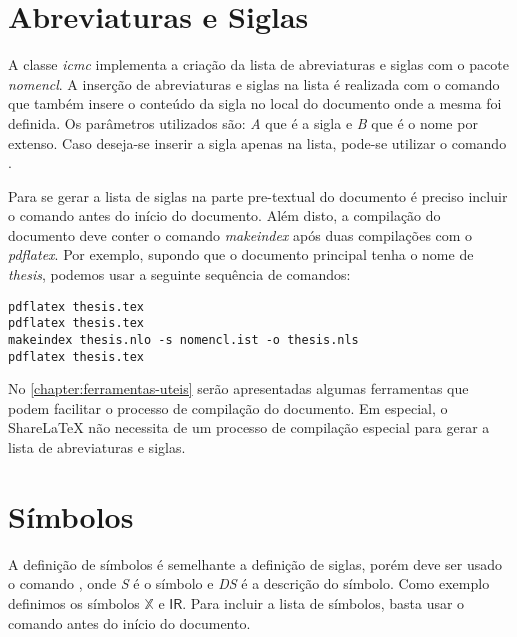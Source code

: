 \section{Abreviaturas e Siglas}

A classe \textit{icmc} implementa a criação da lista de abreviaturas e siglas com o pacote \textit{nomencl}. A inserção de abreviaturas e siglas na lista é realizada com o comando  que também insere o conteúdo da sigla no local do documento onde a mesma foi definida. Os parâmetros utilizados são: \textit{A} que é a sigla e \textit{B} que é o nome por extenso. Caso deseja-se inserir a sigla apenas na lista, pode-se utilizar o comando .

Para se gerar a lista de siglas na parte pre-textual do documento é preciso incluir o comando  antes do início do documento. Além disto, a compilação do documento deve conter o comando \textit{makeindex} após duas compilações com o \textit{pdflatex}. Por exemplo, supondo que o documento principal tenha o nome de \textit{thesis}, podemos usar a seguinte sequência de comandos:

\begin{verbatim}
pdflatex thesis.tex
pdflatex thesis.tex
makeindex thesis.nlo -s nomencl.ist -o thesis.nls
pdflatex thesis.tex
\end{verbatim}

No \autoref{chapter:ferramentas-uteis} serão apresentadas algumas ferramentas que podem facilitar o processo de compilação do documento. Em especial, o ShareLaTeX não necessita de um processo de compilação especial para gerar a lista de abreviaturas e siglas.


\section{Símbolos}

A definição de símbolos é semelhante a definição de siglas, porém deve ser usado o comando , onde \textit{S} é o símbolo e \textit{DS} é a descrição do símbolo. Como exemplo definimos os símbolos $\mathbb{X}$ e $\mathsf{I\!R}$. Para incluir a lista de símbolos, basta usar o comando  antes do início do documento.